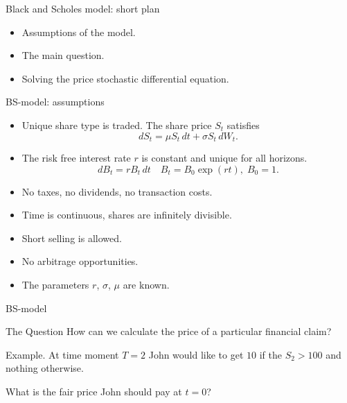 
\begin{frame} %

    
    \end{frame}
    
    
    \begin{frame}{Black and Scholes model: short plan}
    
      \begin{itemize}[<+->]
        \item \alert{Assumptions} of the model.
        \item The main \alert{question}.
        \item Solving the price \alert{stochastic differential equation}.
      \end{itemize}
    
    \end{frame}


\begin{frame}{BS-model: assumptions \informalduck}
        
\begin{itemize}[<+->]
          \item \alert{Unique} share type is traded. The share price $S_t$ satisfies 
          \[
          dS_t = \mu S_t \, dt + \sigma S_t  \, dW_t.
          \]
          \item The \alert{risk free} interest rate $r$ is constant and unique for all horizons. 
          \[
          dB_t = r B_t \, dt  \quad B_t = B_0 \exp(rt), \; B_0 =1.
          \]
          \item No taxes, no dividends, \alert{no transaction costs}. 
          \item Time is continuous, shares are \alert{infinitely divisible}.
          \item \alert{Short selling} is allowed.  
          \item \alert{No arbitrage} opportunities.
          \item The parameters $r$, $\sigma$, $\mu$ \alert{are known}.
\end{itemize}
        
\end{frame}

\begin{frame}{BS-model}

\begin{block}{The Question}
  How can we calculate the price of a particular financial claim?  
\end{block}

\pause

\alert{Example}. At time moment $T=2$ John would like to get $10$ if the $S_2 > 100$ and nothing otherwise. 

\pause 

What is the fair price John should pay at $t=0$?

\end{frame}


